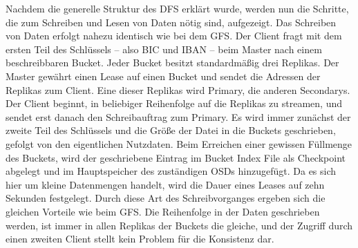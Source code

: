 \documentclass[12pt,oneside,a4paper,parskip]{scrbook}
\begin{document}
Nachdem die generelle Struktur des DFS erklärt wurde, werden nun die Schritte, die zum Schreiben und Lesen von Daten nötig sind, aufgezeigt.
Das Schreiben von Daten erfolgt nahezu identisch wie bei dem GFS. Der Client fragt mit dem ersten Teil des Schlüssels – also BIC und IBAN – beim Master nach einem beschreibbaren Bucket. Jeder Bucket besitzt standardmäßig drei Replikas. Der Master gewährt einen Lease auf einen Bucket und sendet die Adressen der Replikas zum Client. Eine dieser Replikas wird Primary, die anderen Secondarys. Der Client beginnt, in beliebiger Reihenfolge auf die Replikas zu streamen, und sendet erst danach den Schreibauftrag zum Primary. Es wird immer zunächst der zweite Teil des Schlüssels und die Größe der Datei in die Buckets geschrieben, gefolgt von den eigentlichen Nutzdaten. Beim Erreichen einer gewissen Füllmenge des Buckets, wird der geschriebene Eintrag im Bucket Index File als Checkpoint abgelegt und im Hauptspeicher des zuständigen OSDs hinzugefügt. Da es sich hier um kleine Datenmengen handelt, wird die Dauer eines Leases auf zehn Sekunden festgelegt. Durch diese Art des Schreibvorganges ergeben sich die gleichen Vorteile wie beim GFS. Die Reihenfolge in der Daten geschrieben werden, ist immer in allen Replikas der Buckets die gleiche, und der Zugriff durch einen zweiten Client stellt kein Problem für die Konsistenz dar.
\end{document}
